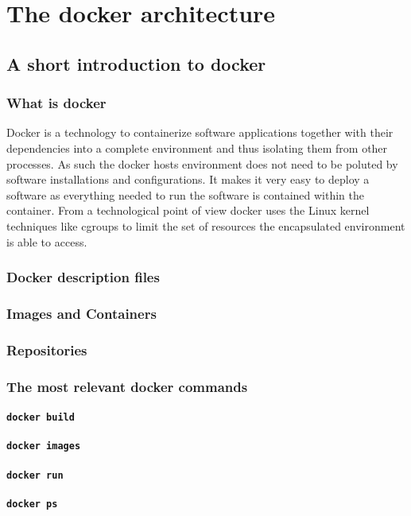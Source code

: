 \chapter{The docker architecture}\label{p01:ch5}
	\section{A short introduction to docker}
		\subsection{What is docker}
		Docker is a technology to containerize software applications together with their dependencies into a complete environment and thus isolating them from other processes. As such the docker hosts environment does not need to be poluted by software installations and configurations. It makes it very easy to deploy a software as everything needed to run the software is contained within the container. From a technological point of view docker uses the Linux kernel techniques like cgroups to limit the set of resources the encapsulated environment is able to access.
		\subsection{Docker description files}
		\subsection{Images and Containers}
		\subsection{Repositories}
		\subsection{The most relevant docker commands}
			\subsubsection{\texttt{docker build}}
			\subsubsection{\texttt{docker images}}
			\subsubsection{\texttt{docker run}}
			\subsubsection{\texttt{docker ps}}
